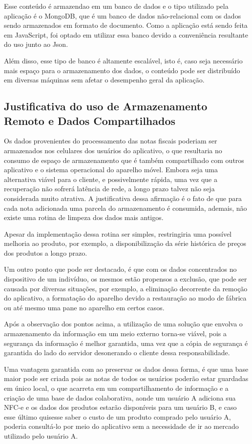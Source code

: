 Esse conteúdo é armazendao em um banco de dados e o tipo utilizado pela aplicação é o MongoDB, que é um banco de dados não-relacional com os dados sendo armazenados em formato de documento. Como a aplicação está sendo feita em JavaScript, foi optado em utilizar essa banco devido a conveniência resultante do uso junto ao Json.

Além disso, esse tipo de banco é altamente escalável, isto é, caso seja necessário mais espaço para o armazenamento dos dados, o conteúdo pode ser distribuído em diversas máquinas sem afetar o desempenho geral da aplicação.

\subsection{Justificativa do uso de Armazenamento Remoto e Dados Compartilhados}

Os dados provenientes do processamento das notas fiscais poderiam ser armazenados nos celulares dos usuários do aplicativo, o que resultaria no consumo de espaço de armazenamento que é também compartilhado com outros aplicativo e o sistema operacional do aparelho móvel. Embora seja uma alternativa viável para o cliente, e possivelmente rápida, uma vez que a recuperação não sofrerá latência de rede, a longo prazo talvez não seja considerada muito atrativa. A justificativa dessa afirmação é o fato de que para cada nota adicionada uma parcela do armazenamento é consumida, ademais, não existe uma rotina de limpeza dos dados mais antigos.

Apesar da implementação dessa rotina ser simples, restringiria uma possível melhoria ao produto, por exemplo, a disponibilização da série histórica de preços dos produtos a longo prazo.

Um outro ponto que pode ser destacado, é que com os dados concentrados no dispositivo de um indivíduo, os mesmos estão propensos a exclusão, que pode ser causada por diversas situações, por exemplo, a eliminação decorrente da remoção do aplicativo, a formatação do aparelho devido a restauração ao modo de fábrica ou até mesmo uma pane no aparelho em certos casos.

Após a observação dos pontos acima, a utilização de uma solução que envolva o armazenamento da informação em um meio externo torna-se viável, pois a segurança da informação é melhor garantida, uma vez que a cópia de segurança é garantida do lado do servidor desonerando o cliente dessa responsabilidade.

Uma vantagem garantida com ao preservar os dados dessa forma, é que uma base maior pode ser criada pois as notas de todos os usuários poderão estar guardadas em único local, o que acarreta em um compartilhamento de informação e a criação de uma base de dados colaborativa, aonde um usuário A adiciona sua NFC-e e os dados dos produtos estarão disponíveis para um usuário B, e caso esse último quisesse saber o custo de um produto comprado pelo usuário A, poderia consultá-lo por meio do aplicativo sem a necessidade de ir ao mercado utilizado pelo usuário A.


